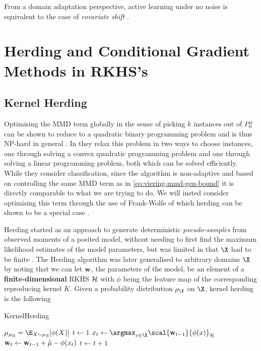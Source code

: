 From a domain adaptation perspective, active learning under no noise is
equivalent to the case of \emph{covariate shift}
\cite{gretton09_covar_shift_by_kernel_mean_match}.

\section{Herding and Conditional Gradient Methods in RKHS's}
\subsection{Kernel Herding}
Optimising the MMD term globally in the sense of
picking \(k\) instances out of \(P^x_{0}\) can be shown to reduce to a
quadratic binary programming problem and is thus NP-hard in general
\cite{chaovalitwongse09_quadr_integ_progr}. In
\cite{chattopadhyay13_batch_mode_activ_sampl_based} they relax this problem in
two ways to choose instances, one through solving a convex quadratic programming
problem and one through solving a linear programming problem, both which can be
solved efficiently. While they consider classification, since the algorithm is
non-adaptive and based on controlling the same MMD term as in
\ref{eq:viering-mmd-gen-bound} it is directly comparable to what we are trying
to do. We will insted consider optimising this term through the use of
Frank-Wolfe \cite{frank56_algor_quadr_progr,jaggi13_revis_frank_wolfe} of which
herding can be shown to be a special case
\cite{bach12_equiv_between_herdin_condit_gradien_algor}.

Herding started as an approach to generate deterministic \emph{pseudo-samples}
from observed moments of a posited model, without needing to first find the
maximum likelihood estimates of the model parameters, but was limited in that
\(\X\) had to be finite \cite{welling09_herdin}. The Herding algorithm was later
generalised to arbitrary domains \(\X\) by
\cite{chen12_super_sampl_from_kernel_herdin} noting that we can let \(\mathbf{w}\),
the parameters of the model, be an element of a \textbf{finite-dimensional} RKHS
\(\mathcal{H}\) with \(\phi\) being the feature map of the corresponding
reproducing kernel \(K\). Given a probability distribution \(\rho_{\X}\) on
\(\X\), kernel herding is the following
\begin{algorithm}
  \caption{KernelHerding}\label{alg:kernel-herding}
  \begin{algorithmic}[1]  \State $\mu_{\rho_{\X}} = \E_{X \sim
\rho_{\X}}[\phi(X)]$ \State $t \gets 1$  \State $x_{t} \gets
\argmax_{x \in \X} \scal{\mat{w}_{t-1}}{\phi(x)}_{\rkhs{H}}$ \State $\mathbf{w}_{t}
\gets \mathbf{w}_{t-1} + \hat{\mu} - \phi(x_{t})$ \State $t \gets t + 1$ \EndWhile
\EndProcedure
  \end{algorithmic}
\end{algorithm}


